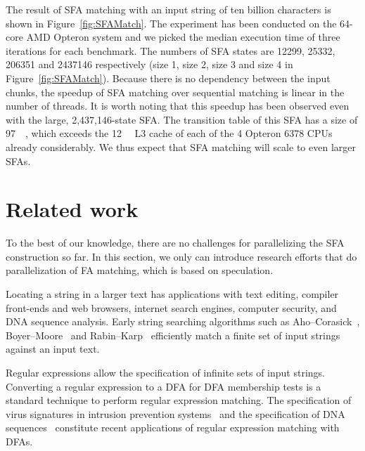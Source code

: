 \documentclass[10pt, conference, compsocconf]{IEEEtran}
\begin{document}
The result of SFA matching with an input string of ten billion characters is
shown in  Figure~\ref{fig:SFAMatch}. The experiment has been conducted on the
64-core AMD Opteron system and we picked the median execution time of three
iterations for each benchmark.  The numbers of SFA states are 12299, 25332,
206351 and 2437146 respectively (size 1, size 2, size 3 and size 4 in
Figure~\ref{fig:SFAMatch}).  Because there is no dependency between the input
chunks, the speedup of SFA matching over sequential matching is linear in the
number of threads.
It is worth noting that this speedup has been observed even
with the large, 2,437,146-state SFA. The transition table of
this SFA has a size of \SI{97}{\mega\byte}, which exceeds
the \SI{12}{\mega\byte} L3 cache of each of the 4 Opteron 6378
CPUs already considerably. We thus expect that SFA matching will
scale to even larger SFAs.


\section{Related work}
\label{sec:relatedWork}
To the best of our knowledge, there are no challenges for parallelizing
the SFA construction so far. In this section, we only can 
introduce research efforts that do parallelization of FA matching,
which is based on speculation. 

Locating a string in a larger text has applications
with text editing, compiler front-ends and web browsers,
internet search engines, computer security, and DNA sequence analysis.
Early string
searching algorithms such as Aho--Corasick~\cite{Aho:1975},
Boyer--Moore~\cite{Boyer:1977} and Rabin--Karp~\cite{Karp:1987}
efficiently match a finite set of input strings
against an input text.

Regular expressions allow the specification of
infinite sets of input strings.
Converting a regular expression to a DFA for DFA membership tests is a
standard technique to perform regular expression matching.
The specification of virus signatures in intrusion
prevention systems~\cite{Brumley2006,Sommer2003,Roesch1999} and
the specification of DNA
sequences~\cite{sigrist2010prosite,boeckmann2003swiss}
constitute recent applications of regular expression matching with DFAs.
\end{document}
